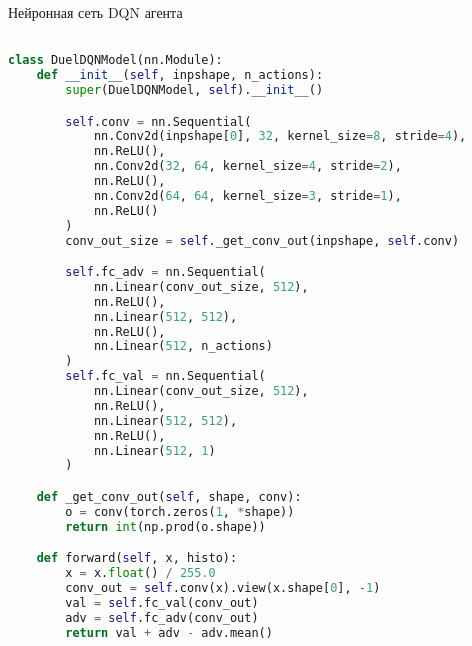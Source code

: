 \begin{ListingEnv}[!h]
\captiondelim{ }
\caption{Нейронная сеть DQN агента}\label{lst:dqn}

\begin{lstlisting}[language=Python]

class DuelDQNModel(nn.Module):
    def __init__(self, inpshape, n_actions):
        super(DuelDQNModel, self).__init__()

        self.conv = nn.Sequential(
            nn.Conv2d(inpshape[0], 32, kernel_size=8, stride=4),
            nn.ReLU(),
            nn.Conv2d(32, 64, kernel_size=4, stride=2),
            nn.ReLU(),
            nn.Conv2d(64, 64, kernel_size=3, stride=1),
            nn.ReLU()
        )
        conv_out_size = self._get_conv_out(inpshape, self.conv)

        self.fc_adv = nn.Sequential(
            nn.Linear(conv_out_size, 512),
            nn.ReLU(),
            nn.Linear(512, 512),
            nn.ReLU(),
            nn.Linear(512, n_actions)
        )
        self.fc_val = nn.Sequential(
            nn.Linear(conv_out_size, 512),
            nn.ReLU(),
            nn.Linear(512, 512),
            nn.ReLU(),
            nn.Linear(512, 1)
        )

    def _get_conv_out(self, shape, conv):
        o = conv(torch.zeros(1, *shape))
        return int(np.prod(o.shape))

    def forward(self, x, histo):
        x = x.float() / 255.0
        conv_out = self.conv(x).view(x.shape[0], -1)
        val = self.fc_val(conv_out)
        adv = self.fc_adv(conv_out)
        return val + adv - adv.mean()
\end{lstlisting}
\end{ListingEnv}


